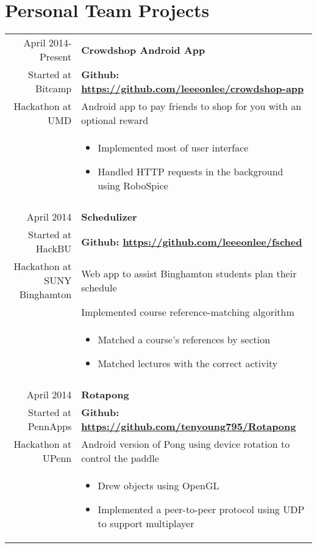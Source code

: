 \documentclass[letterpaper,10pt]{article} %
\begin{document}
\section{Personal Team Projects}

\begin{longtable}{r|p{4.5in}}
    April 2014-Present & \textbf{Crowdshop Android App} \\
    Started at Bitcamp & \textbf{Github: \url{https://github.com/leeeonlee/crowdshop-app}} \\
    Hackathon at UMD & Android app to pay friends to shop for you with an optional reward \\
    & \begin{itemize}
        \item Implemented most of user interface
        \item Handled HTTP requests in the background using RoboSpice
    \end{itemize} \\

    \multicolumn{2}{c}{} \\

    April 2014 & \textbf{Schedulizer} \\
    Started at HackBU & \textbf{Github: \url{https://github.com/leeeonlee/fsched}} \\
    Hackathon at SUNY Binghamton & Web app to assist Binghamton students plan their schedule \\
    & Implemented course reference-matching algorithm \\ 
    & \begin{itemize}
        \item Matched a course's references by section
        \item Matched lectures with the correct activity
    \end{itemize} \\

    \multicolumn{2}{c}{} \\

    April 2014 & \textbf{Rotapong} \\
    Started at PennApps  & \textbf{Github: \url{https://github.com/tenyoung795/Rotapong}} \\
    Hackathon at UPenn & Android version of Pong using device rotation to control the paddle \\
    & \begin{itemize}
        \item Drew objects using OpenGL
        \item Implemented a peer-to-peer protocol using UDP to support multiplayer
    \end{itemize}

\end{longtable}
\end{document}
